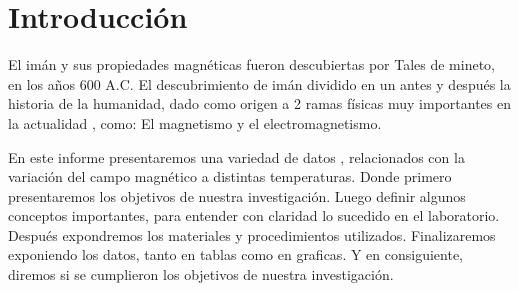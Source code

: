 \section{Introducción}
El imán y sus propiedades magnéticas fueron descubiertas por Tales de mineto, en los años 600 A.C.
El descubrimiento de imán dividido en un antes y después la historia de la humanidad, dado como origen a 2 ramas físicas muy importantes en la actualidad , como: El magnetismo y el electromagnetismo.

En este informe presentaremos una variedad de datos , relacionados con la variación del campo magnético a distintas temperaturas.
Donde primero presentaremos los objetivos de nuestra investigación. Luego definir algunos conceptos importantes, para entender con claridad lo sucedido en el laboratorio. Después expondremos los materiales y procedimientos utilizados. 
Finalizaremos exponiendo los datos, tanto en tablas como en graficas. Y en consiguiente, diremos si se cumplieron los objetivos de nuestra investigación.